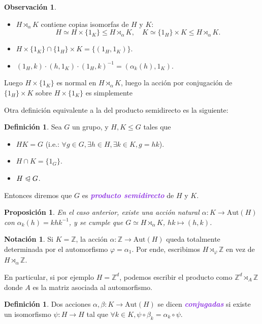 \documentclass{article}
\newtheorem{proposition}[theorem]{Proposición}
\theoremstyle{definition}
\newtheorem{definition}[theorem]{Definición}
\newtheorem*{notation}{Notación}
\newtheorem*{obs}{Observación}
\theoremstyle{remark}
\numberwithin{equation}{section}
\newcommand{\Z}{\mathbb{Z}}
\renewcommand{\a}{\alpha}
\newcommand{\vphi}{\varphi}
\renewcommand{\c}{\cdot}
\newcommand{\normal}{\trianglelefteqslant}
\newcommand{\Aut}{\mathrm{Aut}}
\newcommand{\wea}[1]{\textcolor{BlueViolet}{\textbf{\emph{#1}}}}
\begin{document}
\begin{obs}\
  \begin{itemize}
    \item $H \rtimes_\a K$ contiene copias isomorfas de $H$ y $K$:
    \[ H \simeq H \times \{1_K\} \leqslant H \rtimes_\a K, \quad
    K \simeq \{1_H\} \times K \leqslant H \rtimes_\a K.\]
    \item $H \times \{1_K\} \cap \{1_H\} \times K = \{(1_H,1_K)\}.$
    \item $(1_H,k) \c (h,1_K) \c (1_H,k)^{-1} = (\a_k(h),1_K)$.
  \end{itemize}
  Luego $H \times \{1_K\}$ es normal en $H \rtimes_\a K$, luego la acción por conjugación de $\{1_H\} \times K$ sobre $H \times \{1_K\}$ es simplemente 
\end{obs}

Otra definición equivalente a la del producto semidirecto es la siguiente:

\begin{definition}
  Sea $G$ un grupo, y $H,K \leqslant G$ tales que
  \begin{itemize}[(i)]
    \item $HK = G$ (i.e.: $\forall g \in G, \exists h \in H, \exists k \in K, g = hk$).
    \item $H \cap K = \{1_G\}$.
    \item $H \normal G$.
  \end{itemize}
  Entonces diremos que $G$ es \wea{producto semidirecto} de $H$ y $K$.
\end{definition}

\begin{proposition}
  En el caso anterior, existe una acción natural $\a \colon K \to \Aut(H)$ con $\a_k(h) = khk^{-1}$, y se cumple que $G \simeq H \rtimes_\a K$, $hk \mapsto (h,k)$.
\end{proposition}

\begin{notation}
  Si $K = \Z$, la acción $\a \colon \Z \to \Aut(H)$ queda totalmente determinada por el automorfismo $\vphi = \a_1$. Por ende, escribimos $H \rtimes_\vphi \Z$ en vez de $H \rtimes_\a \Z$.

  En particular, si por ejemplo $H = \Z^d$, podemos escribir el producto como $\Z^d \rtimes_A \Z$ donde $A$ es la matriz asociada al automorfismo.
\end{notation}

\begin{definition}
  Dos acciones $\a,\beta \colon K \to \Aut(H)$ se dicen \wea{conjugadas} si existe un isomorfismo $\psi \colon H \to H$ tal que $\forall k \in K, \psi \circ \beta_k = \a_k \circ \psi$.
\end{definition}
\end{document}
